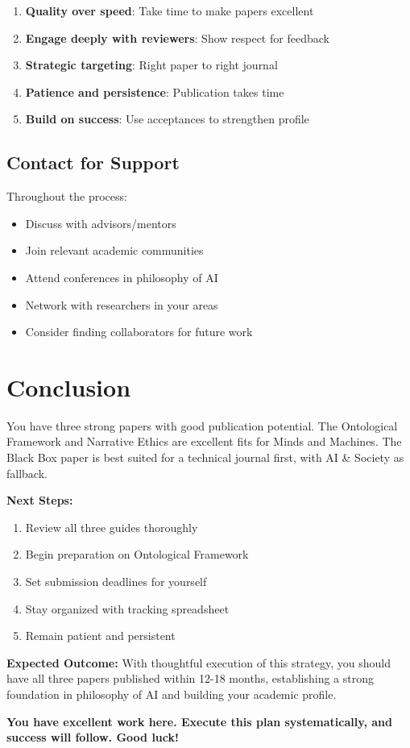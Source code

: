 \documentclass[12pt]{article}
\begin{document}
\begin{enumerate}[leftmargin=*]
\item \textbf{Quality over speed}: Take time to make papers excellent
\item \textbf{Engage deeply with reviewers}: Show respect for feedback
\item \textbf{Strategic targeting}: Right paper to right journal
\item \textbf{Patience and persistence}: Publication takes time
\item \textbf{Build on success}: Use acceptances to strengthen profile
\end{enumerate}

\subsection{Contact for Support}

Throughout the process:
\begin{itemize}[leftmargin=*]
\item Discuss with advisors/mentors
\item Join relevant academic communities
\item Attend conferences in philosophy of AI
\item Network with researchers in your areas
\item Consider finding collaborators for future work
\end{itemize}

\section{Conclusion}

You have three strong papers with good publication potential. The Ontological Framework and Narrative Ethics are excellent fits for Minds and Machines. The Black Box paper is best suited for a technical journal first, with AI \& Society as fallback.

\textbf{Next Steps:}
\begin{enumerate}
\item Review all three guides thoroughly
\item Begin preparation on Ontological Framework
\item Set submission deadlines for yourself
\item Stay organized with tracking spreadsheet
\item Remain patient and persistent
\end{enumerate}

\textbf{Expected Outcome:} With thoughtful execution of this strategy, you should have all three papers published within 12-18 months, establishing a strong foundation in philosophy of AI and building your academic profile.

\vspace{1em}
\noindent\textbf{You have excellent work here. Execute this plan systematically, and success will follow. Good luck!}
\end{document}
